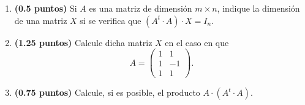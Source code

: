 
\begin{enumerate}[label=\alph*)]
\item \textbf{(0.5 puntos)} Si $A$ es una matriz de dimensión $m\times n$, indique la dimensión de una matriz $X$ si se verifica que $(A^t\cdot A)\cdot X=I_n$.
\item \textbf{(1.25 puntos)} Calcule dicha matriz $X$ en el caso en que
\[
A=\begin{pmatrix}1&1\\1&-1\\1&1\end{pmatrix}.
\]
\item \textbf{(0.75 puntos)} Calcule, si es posible, el producto $A\cdot(A^t\cdot A)$.
\end{enumerate}
